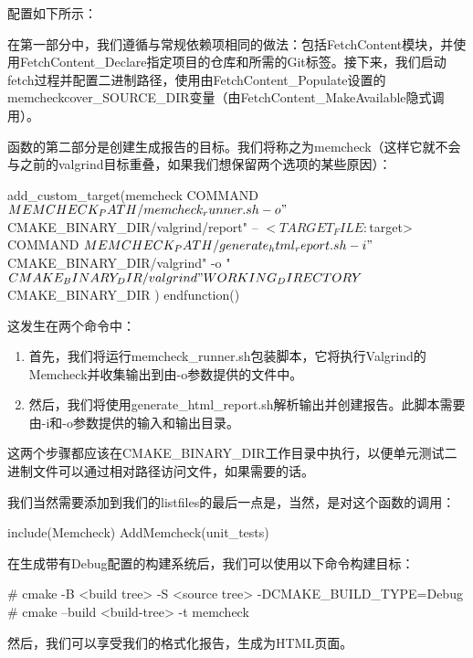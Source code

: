 配置如下所示：



在第一部分中，我们遵循与常规依赖项相同的做法：包括FetchContent模块，并使用FetchContent\_Declare指定项目的仓库和所需的Git标签。接下来，我们启动fetch过程并配置二进制路径，使用由FetchContent\_Populate设置的memcheckcover\_SOURCE\_DIR变量（由FetchContent\_MakeAvailable隐式调用）。

函数的第二部分是创建生成报告的目标。我们将称之为memcheck（这样它就不会与之前的valgrind目标重叠，如果我们想保留两个选项的某些原因）：


\begin{cmake}
    add_custom_target(memcheck
        COMMAND ${MEMCHECK_PATH}/memcheck_runner.sh -o
            "${CMAKE_BINARY_DIR}/valgrind/report"
            -- $<TARGET_FILE:${target}>
        COMMAND ${MEMCHECK_PATH}/generate_html_report.sh
            -i "${CMAKE_BINARY_DIR}/valgrind"
            -o "${CMAKE_BINARY_DIR}/valgrind"
        WORKING_DIRECTORY ${CMAKE_BINARY_DIR}
    )
endfunction()
\end{cmake}

这发生在两个命令中：

\begin{enumerate}
\item
首先，我们将运行memcheck\_runner.sh包装脚本，它将执行Valgrind的Memcheck并收集输出到由-o参数提供的文件中。

\item
然后，我们将使用generate\_html\_report.sh解析输出并创建报告。此脚本需要由-i和-o参数提供的输入和输出目录。
\end{enumerate}

这两个步骤都应该在CMAKE\_BINARY\_DIR工作目录中执行，以便单元测试二进制文件可以通过相对路径访问文件，如果需要的话。

我们当然需要添加到我们的listfiles的最后一点是，当然，是对这个函数的调用：


\begin{cmake}
include(Memcheck)
AddMemcheck(unit_tests)
\end{cmake}

在生成带有Debug配置的构建系统后，我们可以使用以下命令构建目标：

\begin{shell}
# cmake -B <build tree> -S <source tree> -DCMAKE_BUILD_TYPE=Debug
# cmake --build <build-tree> -t memcheck
\end{shell}

然后，我们可以享受我们的格式化报告，生成为HTML页面。





